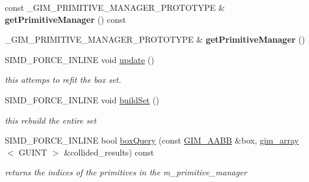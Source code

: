 \begin{DoxyCompactItemize}
\item 
\mbox{\label{classGIM__BOX__TREE__TEMPLATE__SET_a2b079418648fa9ffb25d7befc2736b7f}} 
const \+\_\+\+G\+I\+M\+\_\+\+P\+R\+I\+M\+I\+T\+I\+V\+E\+\_\+\+M\+A\+N\+A\+G\+E\+R\+\_\+\+P\+R\+O\+T\+O\+T\+Y\+PE \& {\bfseries get\+Primitive\+Manager} () const
\item 
\mbox{\label{classGIM__BOX__TREE__TEMPLATE__SET_aa4484dfef41de1058825308d8a19e025}} 
\+\_\+\+G\+I\+M\+\_\+\+P\+R\+I\+M\+I\+T\+I\+V\+E\+\_\+\+M\+A\+N\+A\+G\+E\+R\+\_\+\+P\+R\+O\+T\+O\+T\+Y\+PE \& {\bfseries get\+Primitive\+Manager} ()
\end{DoxyCompactItemize}
\textbf{ }\par
\begin{DoxyCompactItemize}
\item 
S\+I\+M\+D\+\_\+\+F\+O\+R\+C\+E\+\_\+\+I\+N\+L\+I\+NE void \hyperlink{classGIM__BOX__TREE__TEMPLATE__SET_a0f5f2b683e561a4e05d912cb4973dac4}{update} ()
\begin{DoxyCompactList}\small\item\em this attemps to refit the box set. \end{DoxyCompactList}\item 
\mbox{\label{classGIM__BOX__TREE__TEMPLATE__SET_aada2fc55c2e11a4aa5c3ae0c852f4950}} 
S\+I\+M\+D\+\_\+\+F\+O\+R\+C\+E\+\_\+\+I\+N\+L\+I\+NE void \hyperlink{classGIM__BOX__TREE__TEMPLATE__SET_aada2fc55c2e11a4aa5c3ae0c852f4950}{build\+Set} ()
\begin{DoxyCompactList}\small\item\em this rebuild the entire set \end{DoxyCompactList}\item 
\mbox{\label{classGIM__BOX__TREE__TEMPLATE__SET_a275f0e8b4133140f4a53012df5a1aada}} 
S\+I\+M\+D\+\_\+\+F\+O\+R\+C\+E\+\_\+\+I\+N\+L\+I\+NE bool \hyperlink{classGIM__BOX__TREE__TEMPLATE__SET_a275f0e8b4133140f4a53012df5a1aada}{box\+Query} (const \hyperlink{classGIM__AABB}{G\+I\+M\+\_\+\+A\+A\+BB} \&box, \hyperlink{classgim__array}{gim\+\_\+array}$<$ G\+U\+I\+NT $>$ \&collided\+\_\+results) const
\begin{DoxyCompactList}\small\item\em returns the indices of the primitives in the m\+\_\+primitive\+\_\+manager \end{DoxyCompactList}\item 

\end{DoxyCompactItemize}
